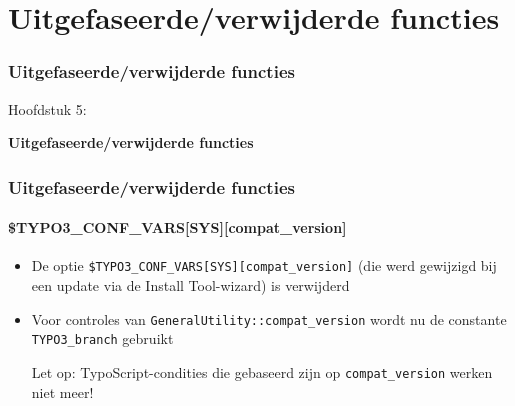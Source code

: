 %

\section{Uitgefaseerde/verwijderde functies}
\begin{frame}[fragile]
	\frametitle{Uitgefaseerde/verwijderde functies}

	\begin{center}\huge{Hoofdstuk 5:}\end{center}
	\begin{center}\huge{\color{typo3darkgrey}\textbf{Uitgefaseerde/verwijderde functies}}\end{center}

\end{frame}


\begin{frame}[fragile]
	\frametitle{Uitgefaseerde/verwijderde functies}
	\framesubtitle{\$TYPO3\_CONF\_VARS[SYS][compat\_version]}

	\begin{itemize}

		\item De optie \texttt{\$TYPO3\_CONF\_VARS[SYS][compat\_version]} (die werd 
			gewijzigd bij een update via de Install Tool-wizard) is verwijderd

		\item Voor controles van \texttt{GeneralUtility::compat\_version} wordt nu 
			de constante \texttt{TYPO3\_branch} gebruikt

			\vspace{0.2cm}

			\begingroup
				\color{red}
					Let op: TypoScript-condities die gebaseerd zijn op \texttt{compat\_version} 
						werken niet meer!
			\endgroup

	\end{itemize}

\end{frame}

